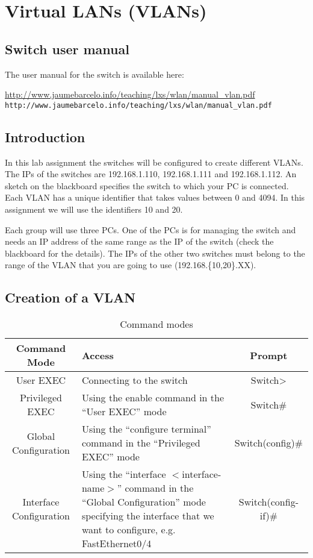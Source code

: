 \chapter{Virtual LANs (VLANs)}

\section{Switch user manual}

The user manual for the switch is available here:

\ifpdf
\url{http://www.jaumebarcelo.info/teaching/lxs/wlan/manual_vlan.pdf}
\else
\texttt{http://www.jaumebarcelo.info/teaching/lxs/wlan/manual\_vlan.pdf}
\fi


\section{Introduction}

In this lab assignment the switches will be configured to create different VLANs.
The IPs of the switches are 192.168.1.110, 192.168.1.111 and 192.168.1.112.
An sketch on the blackboard specifies the switch to which your PC is connected.
Each VLAN has a unique identifier that takes values between 0 and 4094.
In this assignment we will use the identifiers 10 and 20.


Each group will use three PCs.
One of the PCs is for managing the switch and needs an IP address of the same range as the IP of the switch (check the blackboard for the details).
The IPs of the other two switches must belong to the range of the VLAN that you are going to use (192.168.\{10,20\}.XX).


\section{Creation of a VLAN}

\begin{table}[!t]
\renewcommand{\arraystretch}{1.3}
\caption{Command modes}
\label{tab:modes}
\centering
\begin{tabular}{|c|p{5cm}|c|}
\hline
Command Mode & Access & Prompt\\
\hline
User EXEC & Connecting to the switch & Switch> \\
Privileged EXEC & Using the enable command in the ``User EXEC'' mode & Switch\# \\
Global Configuration & Using the ``configure terminal'' command in the ``Privileged EXEC'' mode& Switch(config)\# \\
        Interface Configuration & Using the ``interface $<$interface-name$>$'' command in the ``Global Configuration'' mode specifying the interface that we want to configure, e.g. FastEthernet0/4& Switch(config-if)\# \\
\hline
\end{tabular}
\end{table}


